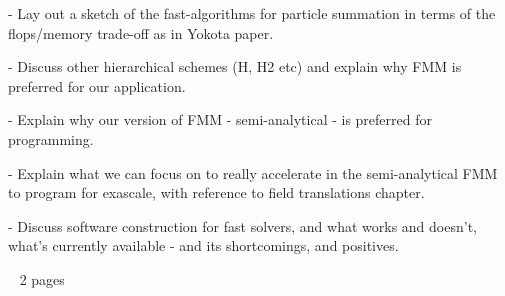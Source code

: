 - Lay out a sketch of the fast-algorithms for particle summation in terms of the flops/memory trade-off as in Yokota paper.

- Discuss other hierarchical schemes (H, H2 etc) and explain why FMM is preferred for our application.

- Explain why our version of FMM - semi-analytical - is preferred for programming.

- Explain what we can focus on to really accelerate in the semi-analytical FMM to program for exascale, with reference to field translations chapter.

- Discuss software construction for fast solvers, and what works and doesn't, what's currently available - and its shortcomings, and positives.

~ 2 pages